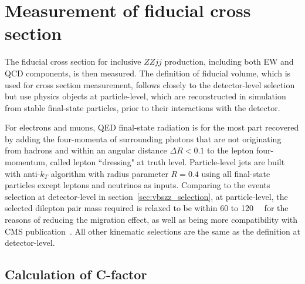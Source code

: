 \section{Measurement of fiducial cross section}
\label{sec:xsec}

The fiducial cross section for inclusive $ZZjj$ production, including both EW and QCD components, is then measured.
The definition of fiducial volume, which is used for cross section measurement, follows closely to the detector-level selection
but use physics objects at particle-level, which are reconstructed in simulation from stable final-state particles,
prior to their interactions with the detector.

For electrons and muons, QED final-state radiation is for the most part recovered 
by adding the four-momenta of surrounding photons that are not originating from hadrons and within an angular distance $\Delta R < 0.1$
to the lepton four-momentum, called lepton ``dressing" at truth level.
Particle-level jets are built with anti-$k_{T}$ algorithm with radius parameter $R = 0.4$ using all final-state particles except leptons and neutrinos as inputs.
Comparing to the events selection at detector-level in section~\ref{sec:vbszz_selection},
at particle-level, the selected dilepton pair mass required is relaxed to be within 60 to 120~\gev~ for the reasons of reducing the migration effect,
as well as being more compatibility with CMS publication~\cite{2017682}.
All other kinematic selections are the same as the definition at detector-level.

\subsection{Calculation of C-factor}
\label{sec:cf}

